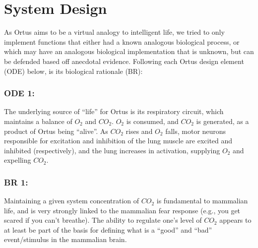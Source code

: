 \documentclass[letterpaper]{article}
\begin{document}
\section{System Design}


As Ortus aims to be a virtual analogy to intelligent life, we tried to only implement functions that either had a known analogous biological process, or which may have an analogous biological implementation that is unknown, but can be defended based off anecdotal evidence. Following each Ortus design element (ODE) below, is its biological rationale (BR):





\subsubsection{ODE 1:} The underlying source of ``life'' for Ortus is its respiratory circuit, which maintains a balance of $O_2$ and $CO_2$. $O_2$ is consumed, and $CO_2$ is generated, as a product of Ortus being ``alive''. As $CO_2$ rises and $O_2$ falls, motor neurons responsible for excitation and inhibition of the lung muscle are excited and inhibited (respectively), and the lung increases in activation, supplying $O_2$ and expelling $CO_2$. 

\subsubsection{BR 1:} Maintaining a given system concentration of $CO_2$ is fundamental to mammalian life, and is very strongly linked to the mammalian fear response (e.g., you get scared if you can't breathe). The ability to regulate one's level of $CO_2$ appears to at least be part of the basis for defining what is a ``good'' and ``bad'' event/stimulus in the mammalian brain.
\end{document}
